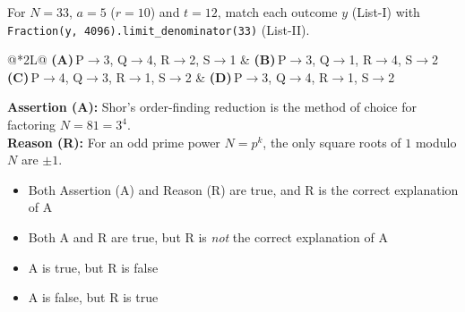 \documentclass[11pt,a4paper]{article}
\newcommand{\optlabel}[1]{\textbf{(#1)}}
\newenvironment{qitem}[1]{\begin{list}{}{\setlength{\leftmargin}{3.3em}\setlength{\labelwidth}{3.1em}%
  \setlength{\labelsep}{0.2em}\setlength{\topsep}{3pt}\setlength{\parsep}{3pt}}\item[\textbf{Q.#1}\hfill]}{\end{list}}
\newcommand{\qsep}{\par\vspace{2pt}{\color{black!15}\hrule}\vspace{4pt}}
\begin{document}
\begin{qitem}{56}
For $N = 33$, $a = 5$ ($r = 10$) and $t = 12$, match each outcome $y$ (List-I) with \texttt{Fraction(y, 4096).limit\_denominator(33)} (List-II).
\par\smallskip{}
\par\smallskip\noindent\begin{tabularx}{\linewidth}{@{}*{2}{L}@{}}
\optlabel{A}\,P$\to$3, Q$\to$4, R$\to$2, S$\to$1 & \optlabel{B}\,P$\to$3, Q$\to$1, R$\to$4, S$\to$2 \\[3pt]
\optlabel{C}\,P$\to$4, Q$\to$3, R$\to$1, S$\to$2 & \optlabel{D}\,P$\to$3, Q$\to$4, R$\to$1, S$\to$2
\end{tabularx}
\end{qitem}
\qsep

\begin{qitem}{57}
\textbf{Assertion (A):} Shor's order-finding reduction is the method of choice for factoring $N = 81 = 3^4$.\\[1mm]
\textbf{Reason (R):} For an odd prime power $N = p^k$, the only square roots of $1$ modulo $N$ are $\pm1$.
\begin{itemize}[leftmargin=2.6em, labelsep=0.4em, itemsep=2pt, topsep=3pt]
\item[\optlabel{A}] Both Assertion (A) and Reason (R) are true, and R is the correct explanation of A
\item[\optlabel{B}] Both A and R are true, but R is \emph{not} the correct explanation of A
\item[\optlabel{C}] A is true, but R is false
\item[\optlabel{D}] A is false, but R is true
\end{itemize}
\end{qitem}
\qsep
\end{document}
